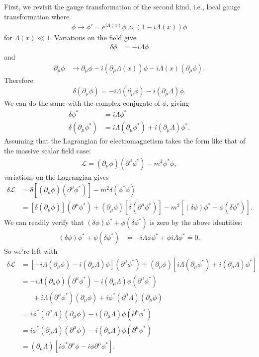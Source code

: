 \documentclass[a4paper,11pt]{article}
\numberwithin{equation}{section}
\theoremstyle{definition}
\newcommand{\p}{\partial}
\newcommand{\lag}{\mathcal{L}}
\begin{document}
First, we revisit the gauge transformation of the second kind, i.e., local gauge transformation where
\begin{align}
\phi \to \phi' = e^{i\Lambda(x)}\phi \approx (1-i\Lambda(x))\phi
\end{align}
for $\Lambda(x) \ll 1$. Variations on the field give
\begin{align}
\delta \phi &= -i\Lambda \phi
\end{align}
and
\begin{align}
\p_\mu \phi &\to \p_\mu \phi - i(\p_\mu\Lambda(x))\phi - i\Lambda(x)(\p_\mu \phi).
\end{align}
Therefore
\begin{align}
\delta(\p_\mu\phi) = -i\Lambda(\p_\mu\phi) - i(\p_\mu\Lambda)\phi.
\end{align}
We can do the same with the complex conjugate of $\phi$, giving
\begin{align}
\delta \phi^* &= i\Lambda \phi^*\\
\delta(\p_\mu\phi^*) &= i\Lambda(\p_\mu\phi^*) +  i(\p_\mu\Lambda)\phi^*.
\end{align}
Assuming that the Lagrangian for electromagnetism takes the form like that of the massive scalar field case:
\begin{align}
\lag = (\p_\mu\phi)(\p^\mu\phi^*) - m^2\phi^*\phi,
\end{align}
variations on the Lagrangian gives
\begin{align}
\delta \lag &= \delta[(\p_\mu\phi)(\p^\mu\phi^*)] - m^2 \delta(\phi^*\phi)\\
&= [\delta(\p_\mu\phi)](\p^\mu\phi^*) + (\p_\mu\phi)[\delta(\p^\mu\phi^*)] - m^2[(\delta \phi)\phi^* + \phi(\delta \phi^*)].
\end{align}
We can readily verify that $(\delta \phi)\phi^* + \phi(\delta \phi^*)$ is zero by the above identities:
\begin{align}
(\delta \phi)\phi^* + \phi(\delta \phi^*)&= -i\Lambda \phi \phi^* + \phi i\Lambda \phi^* = 0.
\end{align}
So we're left with
\begin{align}
\delta \lag&= [-i\Lambda(\p_\mu\phi) - i(\p_\mu\Lambda)\phi](\p^\mu\phi^*) + (\p_\mu\phi)[i\Lambda(\p_\mu\phi^*) +  i(\p_\mu\Lambda)\phi^*]\\
&= -i\Lambda(\p_\mu\phi)(\p^\mu\phi^*) - i(\p_\mu\Lambda)\phi (\p^\mu\phi^*)\\ 
&\,\,\,\,\,\,\,\,\,\,+ i\Lambda (\p^\mu\phi^*)(\p_\mu\phi) + i\phi^*(\p^\mu\Lambda)(\p_\mu\phi)\\
&= i\phi^*(\p^\mu\Lambda)(\p_\mu\phi) - i(\p_\mu\Lambda)\phi (\p^\mu\phi^*)\\
&= i\phi^*(\p_\mu\Lambda)(\p^\mu\phi) - i(\p_\mu\Lambda)\phi (\p^\mu\phi^*)\\
&= (\p_\mu\Lambda)[i\phi^*\p^\mu\phi - i\phi\p^\mu\phi^*].
\end{align}
\end{document}
